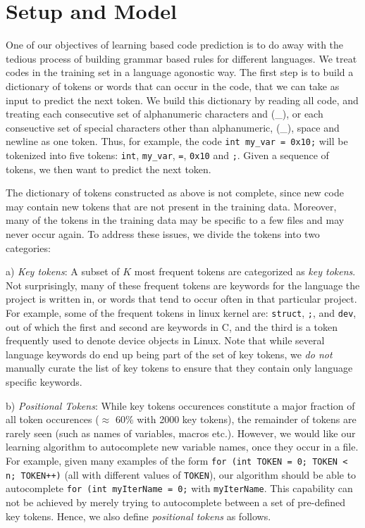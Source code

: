 \section{Setup and Model}
\label{sec:model}

\noindent
One of our objectives of learning based code prediction is to do away with the
tedious process of building grammar based rules for different languages.
We treat codes in the training set in a language agonostic way. The first step
is to build a dictionary of tokens or words that can occur in the code, that we
can take as input to predict the next token. We build this dictionary by
reading all code, and treating each consecutive set of alphanumeric characters
and (\_), or each conseuctive set of special characters other
than alphanumeric, (\_), space and newline as one token.
Thus, for example, the code {\tt int my\_var = 0x10;} will be tokenized into five
tokens: {\tt int}, {\tt my\_var}, {\tt =}, {\tt 0x10} and {\tt ;}. Given a sequence of
tokens, we then want to predict the next token.

The dictionary of tokens constructed as above is not complete, since new code
may contain new tokens that are not present in the training data. Moreover,
many of the tokens in the training data may be specific to a few files and may
never occur again. To address these issues, we divide the tokens into two
categories:

a) {\it Key tokens}: A subset of $K$ most frequent tokens are categorized as
{\it key tokens}. Not surprisingly, many of
these frequent tokens are keywords for the language the project is written in,
or words that tend to occur often in that
particular project.
For example, some of the frequent tokens in linux kernel are:
\texttt{struct}, \texttt{;}, and \texttt{dev}, out of which the first and second
are keywords in C, and the third is a token frequently used to denote device
objects in Linux. Note that while several language keywords do end up being part
of the set of key tokens, we {\it do not} manually curate the list of key tokens
to ensure that they contain only language specific keywords.

b) {\it Positional Tokens}: While key tokens occurences constitute a major
fraction of all token occurences ($\approx$ 60\% with 2000 key tokens),
the remainder of tokens are rarely
seen (such as names of variables, macros etc.). However, we would like our
learning algorithm to autocomplete new variable names, once they occur in a
file. For
example, given many examples of the form {\tt for (int TOKEN = 0; TOKEN < n;
TOKEN++)} (all with different values of {\tt TOKEN}), our algorithm should be
able to autocomplete {\tt for (int myIterName = 0;} with {\tt myIterName}. This
capability can not be achieved by merely trying to autocomplete between a set of
pre-defined key tokens. Hence, we also define {\it positional tokens} as follows.

